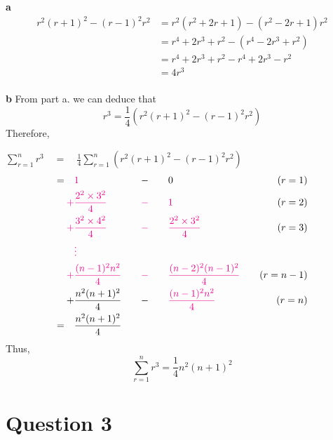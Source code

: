 \documentclass[
  a4paper,
]{report}
\begin{document}
\begin{tcolorbox}[enhanced jigsaw, leftrule=.75mm, left=2mm, opacitybacktitle=0.6, breakable, bottomtitle=1mm, colframe=quarto-callout-tip-color-frame, opacityback=0, colbacktitle=quarto-callout-tip-color!10!white, toptitle=1mm, arc=.35mm, titlerule=0mm, coltitle=black, rightrule=.15mm, bottomrule=.15mm, toprule=.15mm, title={Solution}, colback=white]

\textbf{a} \begin{equation*}
\begin{split}
r^2 (r+1)^2-(r-1)^2 r^2 &= r^2 (r^2+2r+1)-(r^2-2r+1)r^2 \\
&= r^4+2r^3+r^2-(r^4-2r^3+r^2) \\
&= r^4+2r^3+r^2-r^4+2r^3-r^2 \\
&= 4r^3 \\
\end{split}
\end{equation*}

\textbf{b} From part a. we can deduce that
\[r^3=\frac{1}{4}(r^2 (r+1)^2-(r-1)^2 r^2)\] Therefore,

\(\sum_{r=1}^{n}r^3  \quad = \quad \frac{1}{4}\sum_{r=1}^{n} \left(r^2 (r+1)^2-(r-1)^2 r^2\right)\)
\begin{alignat*}{3}
= \quad & \textcolor{magenta}{1} &  -  & \qquad  0  & \quad (r=1) \\
\textcolor{magenta}{+}  & \textcolor{magenta}{\frac{2^2 \times 3^2}{4}}  &\textcolor{magenta}{-} &\qquad \textcolor{magenta}{1} & \quad (r=2) \\
\textcolor{magenta}{+} &\textcolor{magenta}{\frac{3^2 \times 4^2}{4}} &\textcolor{magenta}{-} &\qquad  \textcolor{magenta}{\frac{2^2 \times 3^2}{4}} & \quad (r=3) \\
&\textcolor{magenta}{\vdots} & & \quad & \\
\textcolor{magenta}{+}  & \textcolor{magenta}{\frac{(n-1)^2n^2}{4}}  &\textcolor{magenta}{-} & \qquad  \textcolor{magenta}{\frac{(n-2)^2(n-1)^2}{4}}  & \quad (r=n-1)\\
+ & \frac{n^2(n+1)^2}{4} \quad & -  & \qquad \textcolor{magenta}{\frac{(n-1)^2n^2}{4}} & \quad (r=n)\\
= \quad & \frac{n^2(n+1)^2}{4} & & \quad & 
\end{alignat*} Thus, \[\sum_{r=1}^{n}r^3=\frac{1}{4}n^2(n+1)^2\]

\end{tcolorbox}

\section{Question 3}\label{question-3}
\end{document}
